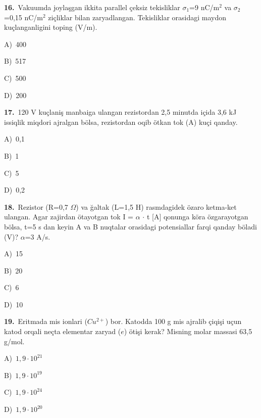 \documentclass[11pt,a4paper]{article}
\newcommand{\opt}[2]{\hspace*{4mm}#1)\ #2\par}
\begin{document}
\noindent\begin{minipage}{\linewidth}
\textbf{16.}\ Vakuumda joylaşgan ikkita parallel çeksiz tekisliklar $\sigma_1$=9 nC/m$^{2}$ va $\sigma_2$=0,15 nC/m$^{2}$ ziçliklar bilan zaryadlangan. Tekisliklar orasidagi maydon kuçlanganligini toping (V/m).\par\smallskip
\opt{A}{400}
\opt{B}{517}
\opt{C}{500}
\opt{D}{200}
\end{minipage}\vspace{9pt}\par
\noindent\begin{minipage}{\linewidth}
\textbf{17.}\ 120 V kuçlaniş manbaiga ulangan rezistordan 2,5 minutda içida 3,6 kJ issiqlik miqdori ajralgan bölsa, rezistordan oqib ötkan tok (A) kuçi qanday.\par\smallskip
\opt{A}{0,1}
\opt{B}{1}
\opt{C}{5}
\opt{D}{0,2}
\end{minipage}\vspace{9pt}\par
\noindent\begin{minipage}{\linewidth}
\textbf{18.}\ Rezistor (R=0,7 $\Omega$) va ğaltak (L=1,5 H) rasmdagidek özaro ketma-ket ulangan. Agar zajirdan ötayotgan tok I = $\alpha$ $\cdot$ t [A] qonunga köra özgarayotgan bölsa, t=5 s dan keyin A va B nuqtalar orasidagi potensiallar farqi qanday böladi (V)? $\alpha$=3 A/s.\par\smallskip
\noindent\hspace*{4mm}\par\smallskip
\opt{A}{15}
\opt{B}{20}
\opt{C}{6}
\opt{D}{10}
\end{minipage}\vspace{9pt}\par
\noindent\begin{minipage}{\linewidth}
\textbf{19.}\ Eritmada mis ionlari ($Cu^{2+}$) bor. Katodda 100 g mis ajralib çiqişi uçun katod orqali neçta elementar zaryad ($e$) ötişi kerak? Misning molar massasi 63,5 g/mol.\par\smallskip
\opt{A}{$1{,}9\cdot10^{21}$}
\opt{B}{$1{,}9\cdot10^{19}$}
\opt{C}{$1{,}9\cdot10^{24}$}
\opt{D}{$1{,}9\cdot10^{20}$}
\end{minipage}\vspace{9pt}\par
\end{document}
